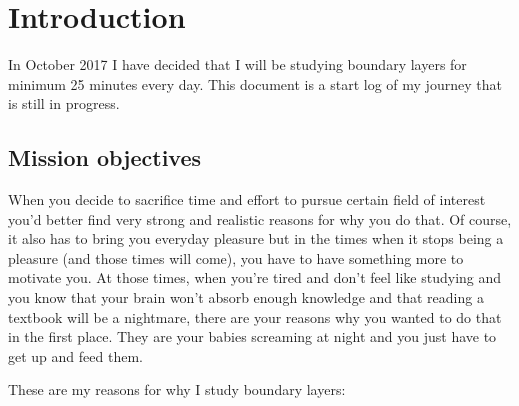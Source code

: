 \documentclass[12pt]{report}
\begin{document}

\setlength{\parindent}{0cm}

\clearpage


\tableofcontents



\setlength{\parskip}{1em}
\renewcommand{\baselinestretch}{1.0}


\newpage


\chapter{Introduction} \label{chap:intro}

In October 2017 I have decided that I will be studying boundary layers for minimum 25 minutes every day. This document is a start log of my journey that is still in progress.


\section{Mission objectives} \label{chap:objectives}

When you decide to sacrifice time and effort to pursue certain field of interest you'd better find very strong and realistic reasons for why you do that. Of course, it also has to bring you everyday pleasure but in the times when it stops being a pleasure (and those times will come), you have to have something more to motivate you. At those times, when you're tired and don't feel like studying and you know that your brain won't absorb enough knowledge and that reading a textbook will be a nightmare, there are your reasons why you wanted to do that in the first place. They are your babies screaming at night and you just have to get up and feed them.

These are my reasons for why I study boundary layers:
\end{document}
